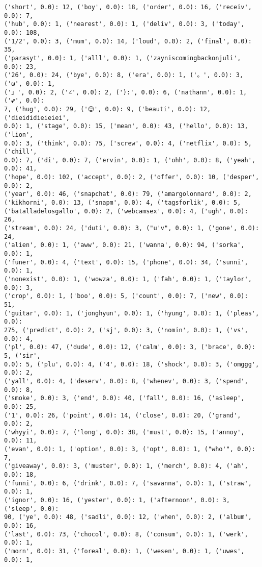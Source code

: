 \documentclass[11pt]{article}
\begin{document}
\begin{Verbatim}[commandchars=\\\{\}]
('short', 0.0): 12, ('boy', 0.0): 18, ('order', 0.0): 16, ('receiv', 0.0): 7,
('hub', 0.0): 1, ('nearest', 0.0): 1, ('deliv', 0.0): 3, ('today', 0.0): 108,
('1/2', 0.0): 3, ('mum', 0.0): 14, ('loud', 0.0): 2, ('final', 0.0): 35,
('parasyt', 0.0): 1, ('alll', 0.0): 1, ('zayniscomingbackonjuli', 0.0): 23,
('26', 0.0): 24, ('bye', 0.0): 8, ('era', 0.0): 1, ('。', 0.0): 3, ('ω', 0.0): 1,
('」', 0.0): 2, ('∠', 0.0): 2, ('):', 0.0): 6, ('nathann', 0.0): 1, ('💕', 0.0):
7, ('hug', 0.0): 29, ('😊', 0.0): 9, ('beauti', 0.0): 12, ('dieididieieiei',
0.0): 1, ('stage', 0.0): 15, ('mean', 0.0): 43, ('hello', 0.0): 13, ('lion',
0.0): 3, ('think', 0.0): 75, ('screw', 0.0): 4, ('netflix', 0.0): 5, ('chill',
0.0): 7, ('di', 0.0): 7, ('ervin', 0.0): 1, ('ohh', 0.0): 8, ('yeah', 0.0): 41,
('hope', 0.0): 102, ('accept', 0.0): 2, ('offer', 0.0): 10, ('desper', 0.0): 2,
('year', 0.0): 46, ('snapchat', 0.0): 79, ('amargolonnard', 0.0): 2,
('kikhorni', 0.0): 13, ('snapm', 0.0): 4, ('tagsforlik', 0.0): 5,
('batalladelosgallo', 0.0): 2, ('webcamsex', 0.0): 4, ('ugh', 0.0): 26,
('stream', 0.0): 24, ('duti', 0.0): 3, ("u'v", 0.0): 1, ('gone', 0.0): 24,
('alien', 0.0): 1, ('aww', 0.0): 21, ('wanna', 0.0): 94, ('sorka', 0.0): 1,
('funer', 0.0): 4, ('text', 0.0): 15, ('phone', 0.0): 34, ('sunni', 0.0): 1,
('nonexist', 0.0): 1, ('wowza', 0.0): 1, ('fah', 0.0): 1, ('taylor', 0.0): 3,
('crop', 0.0): 1, ('boo', 0.0): 5, ('count', 0.0): 7, ('new', 0.0): 51,
('guitar', 0.0): 1, ('jonghyun', 0.0): 1, ('hyung', 0.0): 1, ('pleas', 0.0):
275, ('predict', 0.0): 2, ('sj', 0.0): 3, ('nomin', 0.0): 1, ('vs', 0.0): 4,
('pl', 0.0): 47, ('dude', 0.0): 12, ('calm', 0.0): 3, ('brace', 0.0): 5, ('sir',
0.0): 5, ('plu', 0.0): 4, ('4', 0.0): 18, ('shock', 0.0): 3, ('omggg', 0.0): 2,
('yall', 0.0): 4, ('deserv', 0.0): 8, ('whenev', 0.0): 3, ('spend', 0.0): 8,
('smoke', 0.0): 3, ('end', 0.0): 40, ('fall', 0.0): 16, ('asleep', 0.0): 25,
('1', 0.0): 26, ('point', 0.0): 14, ('close', 0.0): 20, ('grand', 0.0): 2,
('whyyi', 0.0): 7, ('long', 0.0): 38, ('must', 0.0): 15, ('annoy', 0.0): 11,
('evan', 0.0): 1, ('option', 0.0): 3, ('opt', 0.0): 1, ("who'", 0.0): 7,
('giveaway', 0.0): 3, ('muster', 0.0): 1, ('merch', 0.0): 4, ('ah', 0.0): 18,
('funni', 0.0): 6, ('drink', 0.0): 7, ('savanna', 0.0): 1, ('straw', 0.0): 1,
('ignor', 0.0): 16, ('yester', 0.0): 1, ('afternoon', 0.0): 3, ('sleep', 0.0):
90, ('ye', 0.0): 48, ('sadli', 0.0): 12, ('when', 0.0): 2, ('album', 0.0): 16,
('last', 0.0): 73, ('chocol', 0.0): 8, ('consum', 0.0): 1, ('werk', 0.0): 1,
('morn', 0.0): 31, ('foreal', 0.0): 1, ('wesen', 0.0): 1, ('uwes', 0.0): 1,

\end{Verbatim}
\end{document}
